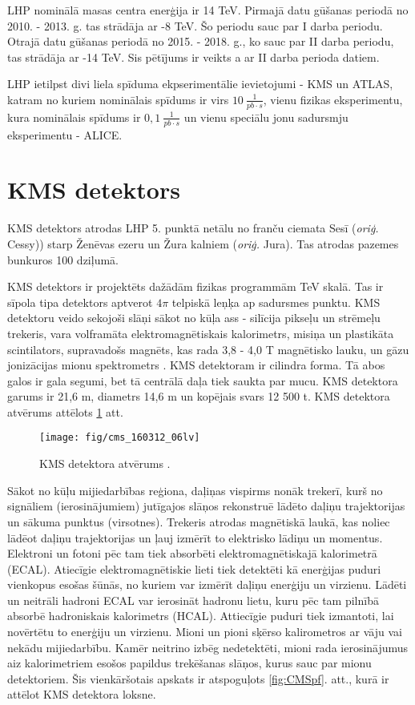 LHP nominālā masas centra enerģija ir 14 TeV. Pirmajā datu gūšanas periodā no 2010. - 2013. g. tas strādāja ar -8 TeV. Šo periodu sauc par I \gls{darba periodu}. Otrajā datu gūšanas periodā no 2015. - 2018. g., ko sauc par II darba periodu, tas strādāja ar -14 TeV. Sis pētījums ir veikts a ar II darba perioda datiem.

LHP ietilpst divi liela spīduma ekpserimentālie ievietojumi - KMS un ATLAS, katram no kuriem nominālais spīdums ir virs $10\ {\frac{1}{pb\cdot s}}$, vienu \cPqb fizikas eksperimentu, kura nominālais spīdums ir $0,1\ \frac{1}{pb\cdot s}$ un vienu speciālu jonu sadursmju eksperimentu - ALICE. 

\section{KMS detektors}

KMS detektors atrodas LHP 5. punktā netālu no franču ciemata Sesī (\textit{oriģ.} Cessy)) starp Ženēvas ezeru un Žura kalniem (\textit{oriģ.} Jura). Tas atrodas pazemes bunkuros 100 dziļumā. 

KMS detektors ir projektēts dažādām fizikas programmām TeV skalā. Tas ir sīpola tipa detektors aptverot $4\pi$ telpiskā leņķa ap sadursmes punktu. KMS detektoru veido sekojoši slāņi sākot no kūļa ass - silīcija pikseļu un \gls{strēmeļu} trekeris, vara volframāta elektromagnētiskais kalorimetrs, misiņa un plastikāta scintilators, supravadošs magnēts, kas rada 3,8 - 4,0 T magnētisko lauku, un gāzu jonizācijas mionu spektrometrs \cite{Chatrchyan:2008aa}. KMS detektoram ir cilindra forma. Tā abos galos ir \gls{gala segumi}, bet tā centrālā daļa tiek saukta par \gls{mucu}. KMS detektora garums ir 21,6 m, diametrs 14,6 m un kopējais svars 12 500 t. KMS detektora atvērums attēlots \ref{fig:CMS_detector} att.

\begin{figure}[hbtp]
\centering
\def\twidth{1}
\texttt{[image: fig/cms\_160312\_06lv]}
\caption{KMS detektora atvērums \cite{Sakuma:2013jqa}.}
\label{fig:CMS_detector}
\end{figure}

Sākot no kūļu mijiedarbības reģiona, daļiņas vispirms nonāk trekerī, kurš no signāliem (\gls{ierosinājumiem}) jutīgajos slāņos rekonstruē lādēto daļiņu trajektorijas un sākuma punktus (\gls{virsotnes}). Trekeris atrodas magnētiskā laukā, kas noliec lādēot daļiņu trajektorijas un ļauj izmērīt to elektrisko lādiņu un momentus. Elektroni un fotoni pēc tam tiek absorbēti elektromagnētiskajā kalorimetrā (ECAL). Atiecīgie elektromagnētiskie lieti tiek detektēti kā enerģijas \gls{puduri} vienkopus esošas šūnās, no kuriem var izmērīt daļiņu enerģiju un virzienu. Lādēti un neitrāli hadroni ECAL var ierosināt hadronu lietu, kuru pēc tam pilnībā absorbē hadroniskais kalorimetrs (HCAL). Attiecīgie puduri tiek izmantoti, lai novērtētu to enerģiju un virzienu.  Mioni un pioni sķērso kalirometros ar vāju vai nekādu mijiedarbību. Kamēr neitrino izbēg nedetektēti, mioni rada ierosinājumus aiz kalorimetriem esošos papildus trekēšanas slāņos, kurus sauc par mionu detektoriem. Šis vienkāršotais apskats ir atspoguļots \ref{fig:CMSpf}. att., kurā ir attēlot KMS detektora loksne.

